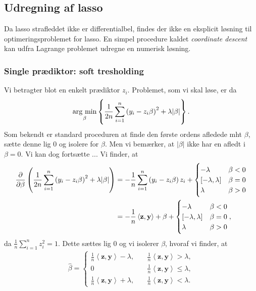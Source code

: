 \subsection{Udregning af lasso} \label{subsec:udregning_lasso}
Da lasso strafleddet ikke er differentialbel, findes der ikke en eksplicit løsning til optimeringsproblemet for lasso.
En simpel procedure kaldet \textit{coordinate descent} kan udfra Lagrange problemet udregne en numerisk løsning. 

\subsubsection{Single prædiktor: soft tresholding}
Vi betragter blot en enkelt prædiktor \(z_i\). 
Problemet, som vi skal løse, er da
\begin{align*}
\argmin_{\beta} \cbr{\frac{1}{2n} \sum_{i=1}^n \del{y_i - z_{i} \beta}^2 + \lambda \vert \beta \vert}.
\end{align*}
Som bekendt er standard proceduren at finde den første ordens afledede mht $\beta$, sætte denne lig 0 og isolere for $\beta$. 
Men vi bemærker, at \(\vert \beta \vert \) ikke har en afledt i $\beta=0$.
Vi kan dog fortsætte ...
Vi finder, at
\begin{align*}
\frac{\partial}{\partial \beta} \del{\frac{1}{2n} \sum_{i=1}^n \del{y_i - z_{i} \beta}^2 + \lambda \vert \beta \vert}
&= -\frac{1}{n} \sum_{i=1}^n \del{y_i - z_{i} \beta} z_i + \begin{cases}
-\lambda \quad &\beta < 0 \\
[-\lambda, \lambda] & \beta = 0 \\
\lambda & \beta >0 
\end{cases}  \\
&= -\frac{1}{n} \left\langle \mathbf{z}, \mathbf{y} \right\rangle + \beta + \begin{cases}
-\lambda \quad &\beta < 0 \\
[-\lambda, \lambda] & \beta = 0 \\
\lambda & \beta >0 
\end{cases},
\end{align*}
da $\frac{1}{n} \sum_{i=1}^n z_i^2=1$. Dette sættes lig 0 og vi isolerer $\beta$, hvoraf vi finder, at
\begin{align}
\hat{\beta} = \begin{cases}
\frac{1}{n} \left\langle \mathbf{z}, \mathbf{y} \right\rangle - \lambda, \quad &\frac{1}{n} \left\langle \mathbf{z}, \mathbf{y} \right\rangle > \lambda, \\
0 &\frac{1}{n} \left\langle \mathbf{z}, \mathbf{y} \right\rangle \leq \lambda, \\
\frac{1}{n} \left\langle \mathbf{z}, \mathbf{y} \right\rangle + \lambda, &\frac{1}{n} \left\langle \mathbf{z}, \mathbf{y} \right\rangle < \lambda.
\end{cases} \label{eq:2.10}
\end{align}
